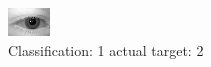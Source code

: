 \begin{figure}[h!]
\begin{center}
\includegraphics[width=0.60\columnwidth]{figures/ID363_class_1_target_2.png}
\end{center}
\caption{ Classification: 1 actual target: 2}
\label{fig:ID363_class_1_target_2}
\end{figure}
